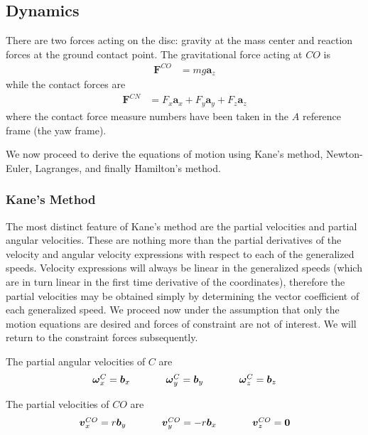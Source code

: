 \documentclass[letterpaper,11pt]{article}
\newcommand{\bs}[1]{\boldsymbol{#1}}
\begin{document}
\subsection{Dynamics}
There are two forces acting on the disc: gravity at the mass center and
reaction forces at the ground contact point.  The gravitational force
acting at $CO$ is
\begin{align}
    \bs{F}^{CO} &= mg\bs{a}_z
    \label{eq:fco}
\end{align}
while the contact forces are
\begin{align}
    \bs{F}^{CN} &= F_x \bs{a}_x + F_y \bs{a}_y + F_z \bs{a}_z
    \label{eq:fcn}
\end{align}
where the contact force measure numbers have been taken in the $A$ reference
frame (the yaw frame).  

We now proceed to derive the equations of motion using Kane's method,
Newton-Euler, Lagranges, and finally Hamilton's method.

\subsubsection{Kane's Method}

The most distinct feature of Kane's method are the partial velocities and
partial angular velocities.  These are nothing more than the partial
derivatives of the velocity and angular velocity expressions with respect to
each of the generalized speeds.  Velocity expressions will always be linear in
the generalized speeds (which are in turn linear in the first time derivative
of the coordinates), therefore the partial velocities may be obtained simply by
determining the vector coefficient of each generalized speed.  We proceed now
under the assumption that only the motion equations are desired and forces of
constraint are not of interest.  We will return to the constraint forces
subsequently.

The partial angular velocities of $C$ are
\begin{equation}
  \begin{tabular}{ccccccc}
      $\bs{\omega}^C_x = \bs{b}_x$ & & &
      $\bs{\omega}^C_y = \bs{b}_y$ & & &
      $\bs{\omega}^C_z = \bs{b}_z$
  \end{tabular}
  \label{eq:pav}
\end{equation}

The partial velocities of $CO$ are
\begin{equation}
  \begin{tabular}{ccccccc}
      $\bs{v}^{CO}_x = r \bs{b}_y$ & & &
      $\bs{v}^{CO}_y = -r \bs{b}_x$ & & &
      $\bs{v}^{CO}_z = \bs{0}$
  \end{tabular}
  \label{eq:pv}
\end{equation}
\end{document}
